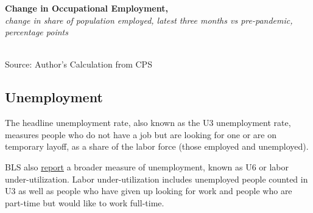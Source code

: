 \documentclass{report}
\newcommand{\tbllink}[1]{\href{https://raw.githubusercontent.com/bdecon/US-chartbook/master/chartbook/data/#1}{\faTable}}
\newcommand{\barylab}[2]{yticklabel style={text width=#1, align=right, 
		style={black!70}, text height=#2},}
\newcommand{\bbar}[2]{extra #1 ticks = {{#2}}, extra #1 tick labels = ,
		extra #1 tick style = {grid=major, grid style={thick, black!25}},}
\begin{document}
{{\begin{minipage}{0.76\textwidth}
\normalsize \textbf{Change in Occupational Employment, }\\
\footnotesize{\textit{change in share of population employed, latest three months vs pre-pandemic, percentage points}}\\
\hspace*{-9mm}  \\
\footnotesize{Source: Author's Calculation from CPS} \hfill \tbllink{occs.csv}
\end{minipage}
\newpage
\begin{minipage}{0.76\textwidth} 
\subsection*{Unemployment}
\hypertarget{labu}{}
\vspace{-0.5mm}
\small The headline unemployment rate, also known as the U3 unemployment rate, measures people who do not have a job but are looking for one or are on temporary layoff, as a share of the labor force (those employed and unemployed). 
\end{minipage}

\begin{minipage}{0.29\textwidth}
\small BLS also \href{https://www.bls.gov/news.release/empsit.t15.htm}{report} a broader measure of unemployment, known as U6 or labor under-utilization. Labor under-utilization includes unemployed people counted in U3 as well as people who have given up looking for work and people who are part-time but would like to work full-time. 


\end{minipage}}}
\end{document}
